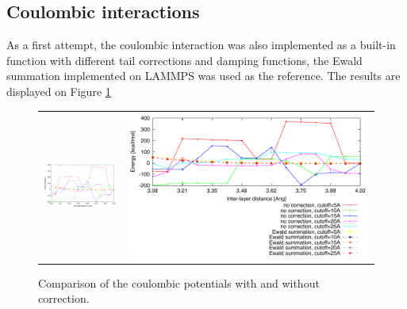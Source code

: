 \begin{samepage}

\subsection{Coulombic interactions}

As a first attempt, the coulombic interaction was also implemented as a built-in function with different tail corrections and damping functions, the Ewald summation implemented on LAMMPS was used as the reference. The results are displayed on Figure \ref{fig:coul_conv}

\begin{figure}[H]
\centering
\begin{tabular}{cr}
\includegraphics[width=6cm]{images/Coul_conv.pdf}&
\includegraphics{images/key.pdf} \\
\end{tabular}
\caption{Comparison of the coulombic potentials with and without correction.}
\label{fig:coul_conv}
\end{figure}

\end{samepage}

